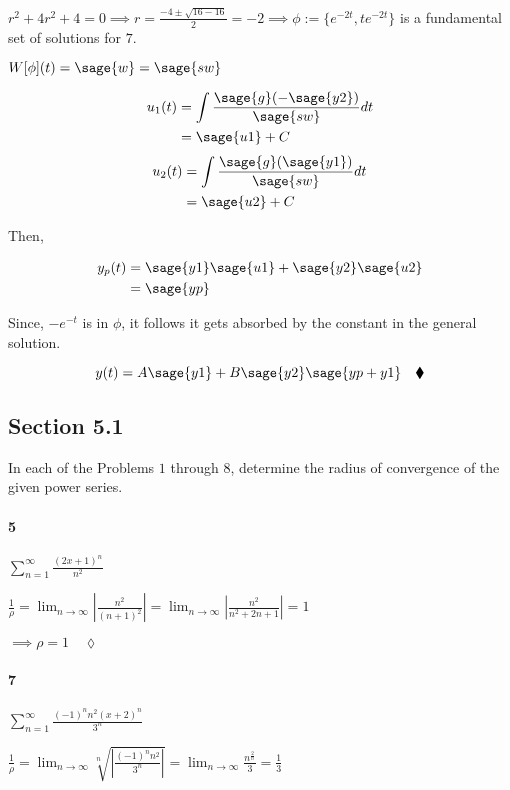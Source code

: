 \documentclass{article}
\begin{document}

$r^2+4r^2+4 = 0 \implies r = \frac{-4\pm\sqrt{16-16}}{2} = -2 \implies
\phi := \{e^{-2t},te^{-2t}\}$ is a fundamental set of solutions for
$7$.

$W[\phi](t) = \sage{w} =\sage{sw}$

\begin{align*}
  u_1(t) &= \int \frac{\sage{g}(-\sage{y2})}{\sage{sw}} dt\\
         &= \sage{u1} + C
\end{align*}
\begin{align*}
  u_2(t) &= \int \frac{\sage{g}(\sage{y1})}{\sage{sw}} dt\\
         &= \sage{u2} + C
\end{align*}

Then,

\begin{align*}
  y_p(t) &= \sage{y1}\sage{u1}+\sage{y2}\sage{u2}\\
         &= \sage{yp}
\end{align*}

Since, $-e^{-t}$ is in $\phi$, it follows it gets absorbed by the
constant in the general solution.

\[y(t) = A\sage{y1}+B\sage{y2} \sage{yp + y1}\quad \blacklozenge \]

\subsection*{Section 5.1}

In each of the Problems $1$ through $8$, determine the radius of
convergence of the given power series.

\paragraph{5} $\sum_{n=1}^{\infty} \frac{(2x+1)^n}{n^2}$

$\frac{1}{\rho} =\lim_{n\rightarrow \infty}
\left|\frac{n^2}{(n+1)^2}\right| = \lim_{n\rightarrow \infty}
\left|\frac{n^2}{n^2+2n+1}\right| = 1$

$\implies \rho = 1\quad\lozenge$

\paragraph{7} $\sum_{n=1}^{\infty} \frac{(-1)^n n^2(x+2)^n}{3^n}$

$\frac{1}{\rho} = \lim_{n\rightarrow \infty}
\sqrt[n]{\left|\frac{(-1)^n n^2}{3^n}\right|} =\lim_{n\rightarrow \infty}
\frac{n^{\frac{2}{n}}}{3} = \frac{1}{3}$
\end{document}
